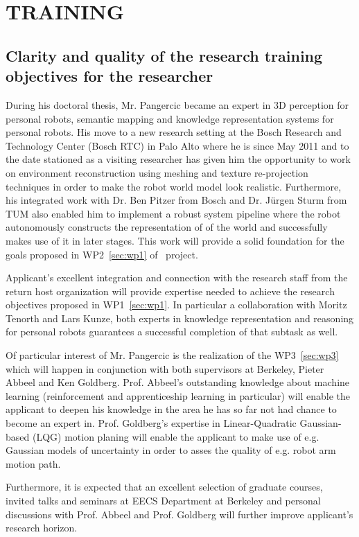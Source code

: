 \section{TRAINING} %
\label{sec:training}
\subsection{Clarity and quality of the research training objectives for the researcher}
During his doctoral thesis, Mr. Pangercic became an expert in 3D perception for personal robots, 
semantic mapping  and knowledge representation systems for personal robots. His move to a new 
research setting at the Bosch Research and Technology Center (Bosch RTC) in Palo Alto where he is since May 2011 and to the
date stationed as a visiting researcher has given him the opportunity to work on environment 
reconstruction using meshing and texture re-projection 
techniques in order to make the robot world model look realistic. Furthermore, his integrated work with 
Dr. Ben Pitzer from Bosch and Dr. J\"urgen Sturm from TUM also enabled him to implement 
a robust system pipeline where the robot autonomously constructs the representation of 
of the world and successfully makes use of it in later stages. This work will provide a solid
foundation for the goals proposed in WP2~\ref{sec:wp1} of \ksem\ project.

Applicant's excellent integration and connection with the research staff from the return
host organization will provide expertise needed to achieve the research objectives proposed
in WP1~\ref{sec:wp1}. In particular a collaboration with Moritz Tenorth and Lars Kunze, both
experts in knowledge representation and reasoning for personal robots guarantees a successful
completion of that subtask as well.

Of particular interest of Mr. Pangercic is the realization of the WP3~\ref{sec:wp3} which
will happen in conjunction with both supervisors at Berkeley, Pieter Abbeel and Ken Goldberg.
Prof. Abbeel's outstanding knowledge about machine learning (reinforcement and apprenticeship
learning in particular) will enable the applicant to deepen his knowledge in the area he has
so far not had chance to become an expert in. Prof. Goldberg's expertise in Linear-Quadratic Gaussian-based 
(LQG) motion planing will enable the applicant to make use of e.g. Gaussian models of uncertainty in order to asses
the quality of e.g. robot arm motion path.

Furthermore, it is expected that an excellent selection of graduate courses, invited talks and 
seminars at EECS Department at Berkeley and personal discussions with Prof. Abbeel and Prof. 
Goldberg will further improve applicant's research horizon.
